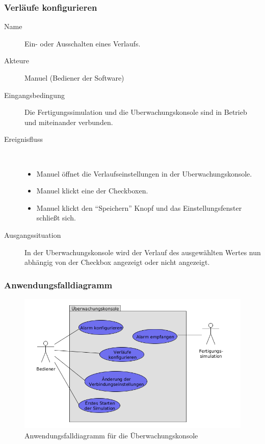 \documentclass[parskip=full]{scrartcl}
\begin{document}
\subsubsection{Verläufe konfigurieren}
\begin{description}
  \item[Name] Ein- oder Ausschalten eines Verlaufs.
  \item[Akteure] Manuel (Bediener der Software)
  \item[Eingangsbedingung] Die \gls{Fertigungssimulation} und die \gls{Uberwachungskonsole} sind in Betrieb und miteinander verbunden.
  \item[Ereignisfluss]~\\
  \begin{itemize}[noitemsep]
    \item Manuel öffnet die Verlaufseinstellungen in der \gls{Uberwachungskonsole}.
    \item Manuel klickt eine der Checkboxen.
    \item Manuel klickt den "`Speichern"' Knopf und das Einstellungsfenster schließt sich.
  \end{itemize}
  \item[Ausgangssituation] In der \gls{Uberwachungskonsole} wird der Verlauf des ausgewählten Wertes nun abhängig von der Checkbox angezeigt oder nicht angezeigt.
\end{description}


\subsubsection{Anwendungsfalldiagramm}
\begin{figure}[h!]
  \centering
  \includegraphics[scale=0.62]{media/UseCases/Ueberwachungskonsole.png}
  \caption{Anwendungsfalldiagramm für die Überwachungskonsole}
\end{figure}
\end{document}
